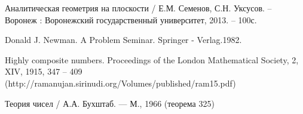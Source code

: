 \documentclass[a4paper,14pt]{article} %
\begin{document}
\begin{thebibliography}{99}

 Аналитическая геометрия на плоскости / Е.М. Семенов, С.Н. Уксусов. – Воронеж : Воронежский государственный университет, 2013. – 100с.

 Donald J. Newman. A Problem Seminar. Springer - Verlag.1982.

 Highly composite numbers. Proceedings of the London Mathematical Society, 2, XIV, 1915, 347 – 409 (http://ramanujan.sirinudi.org/Volumes/published/ram15.pdf)

 Теория чисел / А.А. Бухштаб. --- М., 1966 (теорема 325)


\end{thebibliography}
\end{document}
